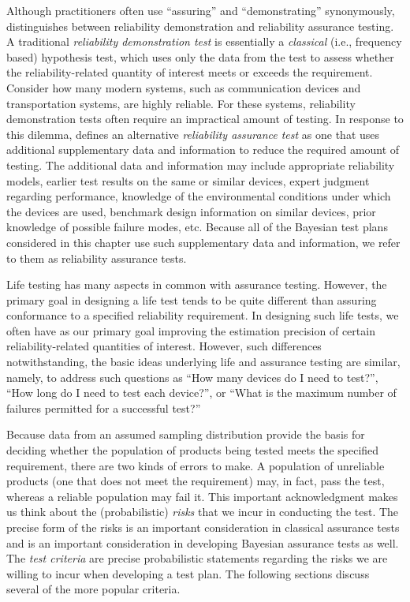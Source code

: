 \documentclass {book}
\begin{document}
Although practitioners often use ``assuring'' and
``demonstrating'' synonymously, \citet{ME04}  distinguishes
between reliability demonstration and reliability assurance
testing. A traditional \emph{reliability demonstration
test} is essentially a
\emph{classical} (i.e., frequency based) hypothesis test, which
uses only the data from the test to assess whether the
reliability-related quantity of interest meets or exceeds the
requirement. Consider how many modern systems, such as
communication devices and transportation systems, are highly
reliable. For these systems, reliability demonstration tests often
require an impractical amount of testing. In response to this
dilemma, \citet{ME04} defines an alternative \emph{reliability
assurance test}
 as one that uses additional
supplementary data and information to reduce the required amount
of testing. The additional data and information may include
appropriate reliability models, earlier test results on the same
or similar devices, expert judgment regarding performance,
knowledge of the environmental conditions under which the devices
are used, benchmark design information on similar devices, prior
knowledge of possible failure modes, etc. Because all of the
Bayesian test plans considered in this chapter use such
supplementary data and information, we refer to them as
reliability assurance tests.

Life testing  has many aspects in common
with assurance testing. However, the primary goal in designing a
life test tends to be quite different than assuring conformance to
a specified reliability requirement. In designing such life tests,
we often have as our primary goal improving the estimation
precision of certain reliability-related quantities of interest.
However, such differences notwithstanding, the basic ideas
underlying life and assurance testing are similar, namely, to
address such questions as ``How many devices do I need to test?'',
``How long do I need to test each device?'', or ``What is the
maximum number of failures permitted for a successful test?''

Because data from an assumed sampling distribution provide the
basis for deciding whether the population of products being tested
meets the specified requirement, there are two kinds of errors to
make. A population of unreliable products (one that does not meet
the requirement) may, in fact, pass the test, whereas a reliable
population may fail it. This important acknowledgment makes us
think about the (probabilistic) \emph{risks} that we incur in
conducting the test. The precise form of the risks is an important
consideration in classical assurance tests and is an important
consideration in developing Bayesian assurance tests as well. The
\emph{test criteria} are precise
probabilistic statements regarding the risks we are willing to
incur when developing a test plan. The following sections discuss
several of the more popular criteria.
\end{document}

